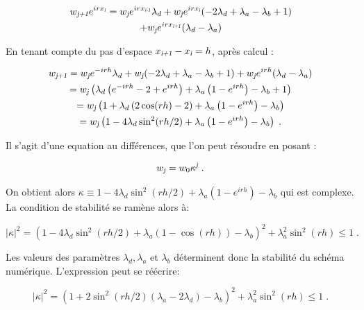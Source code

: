 \documentclass[a4paper, 12pt]{report}
\begin{document}
\begin{multline}
  w_{\textsl{j+1}} e^{irx_{\textsl{i}}} = w_{\textsl{j}} e^{irx_{\textsl{i-1}}}
  \lambda_d + w_{\textsl{j}} e^{irx_{\textsl{i}}} (-2 \lambda_d + \lambda_a - \lambda_b +1)\\
  + w_{\textsl{j}} e^{irx_{\textsl{i+1}}} (\lambda_d - \lambda_a)
\end{multline}

En tenant compte du pas d'espace $x_{\textsl{i+1}}- x_{\textsl{i}}= h$, après calcul :

\begin{multline}
  w_{\textsl{j+1}} = w_{\textsl{j}} e^{-irh} \lambda_d
  + w_{\textsl{j}} (-2 \lambda_d + \lambda_a - \lambda_b +1)
  + w_{\textsl{j}} e^{irh} (\lambda_d - \lambda_a)\\
  = w_{\textsl{j}} \left ( \lambda_d \left ( e^{-irh} -2 + e^{irh} \right )
  + \lambda_a \left (1- e^{irh} \right ) - \lambda_b + 1\right )\\
  = w_{\textsl{j}} \left ( 1 + \lambda_d \left (2\cos(rh) -2  \right )
  + \lambda_a \left (1- e^{irh} \right ) - \lambda_b \right )\\
  = w_{\textsl{j}} \left ( 1 - 4 \lambda_d \sin^2(rh/2)
  + \lambda_a \left (1- e^{irh} \right ) - \lambda_b \right )\;.
\end{multline}

Il s'agit d'une equation au différences, que l'on peut résoudre en posant :

\begin{equation}
  w_{\textsl{j}} = w_{0}\kappa^{\textsl{j}} \;.
\end{equation}

On obtient alors $\kappa \equiv  1 - 4 \lambda_d \sin^2(rh/2) + \lambda_a \left (1- e^{irh} \right ) - \lambda_b$ qui est complexe. La condition de stabilité se ramène alors à:

\begin{equation}
|\kappa|^2 = \left ( 1 - 4 \lambda_d \sin^2(rh/2) + \lambda_a \left (1- \cos(rh) \right ) - \lambda_b \right )^2+ \lambda_a^2 \sin^2(rh) \le 1\;.
\end{equation}

Les valeurs des paramètres $\lambda_d, \lambda_a$ et $\lambda_b$ déterminent donc
la stabilité du schéma numérique. L'expression peut se réécrire:

\begin{equation}
\boxed{|\kappa|^2 = \left ( 1 + 2 \sin^2(rh/2) \left (\lambda_a-2\lambda_d \right )- \lambda_b \right )^2+ \lambda_a^2 \sin^2(rh) \le 1}\;.
\label{eq:kappa_squared}
\end{equation}
\end{document}
